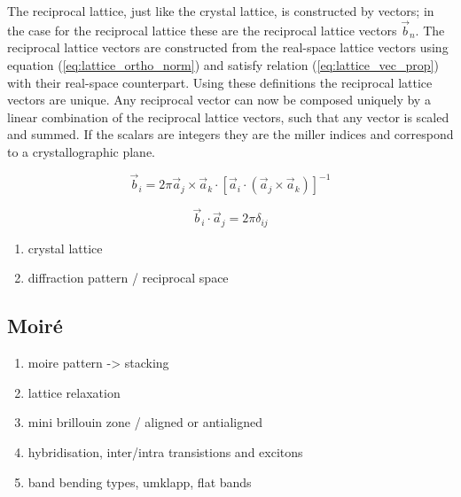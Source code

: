 The reciprocal lattice, just like the crystal lattice, is constructed by vectors; in the case for the reciprocal lattice these are the reciprocal lattice vectors $\vec{b}_n$.
The reciprocal lattice vectors are constructed from the real-space lattice vectors using equation (\ref{eq:lattice_ortho_norm}) and satisfy relation (\ref{eq:lattice_vec_prop}) with their real-space counterpart.
Using these definitions the reciprocal lattice vectors are unique.
Any reciprocal vector can now be composed uniquely by a linear combination of the reciprocal lattice vectors, such that any vector is scaled and summed. If the scalars are integers they are the miller indices and correspond to a crystallographic plane. \\

\begin{minipage}{0.5\textwidth}
    \begin{equation}
        \vec{b}_i = 2 \pi \vec{a}_j \times \vec{a}_k \cdot \left[ \vec{a}_i \cdot ( \vec{a}_j \times \vec{a}_k ) \right]^{-1} 
    \label{eq:lattice_ortho_norm}
   \end{equation}
\end{minipage}%
\begin{minipage}{0.5\textwidth}
    \begin{equation}
        \vec{b}_i \cdot \vec{a}_j = 2\pi \delta_{ij}
    \label{eq:lattice_vec_prop}
   \end{equation}
\end{minipage}


\begin{enumerate}
    \item crystal lattice
    \item diffraction pattern / reciprocal space
\end{enumerate}
\subsection{Moiré}
\begin{enumerate}
    \item moire pattern -> stacking
    \item lattice relaxation
    \item mini brillouin zone / aligned or antialigned
    \item hybridisation, inter/intra transistions and excitons
    \item band bending types, umklapp,  flat bands
\end{enumerate}


